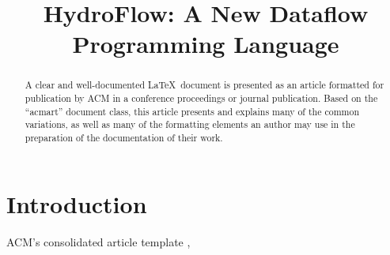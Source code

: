

\let\Bbbk\relax
\usepackage{amssymb}
\usepackage{utf8math,ttquot,mathpartir,amsmath, hydrocomments, mathtools,multicol,xspace,stmaryrd }




\title{HydroFlow: A New Dataflow Programming Language}




\begin{abstract}
  A clear and well-documented \LaTeX\ document is presented as an
  article formatted for publication by ACM in a conference proceedings
  or journal publication. Based on the ``acmart'' document class, this
  article presents and explains many of the common variations, as well
  as many of the formatting elements an author may use in the
  preparation of the documentation of their work.
\end{abstract}



\maketitle

\section{Introduction}
ACM's consolidated article template \cite{mixt}, 





\endinput
